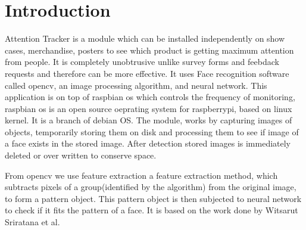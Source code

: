 \section{Introduction}
Attention Tracker is a module which can be installed independently on show cases, merchandise, posters to see which product is getting maximum attention from people. It is completely unobtrusive unlike survey forms and feebdack requests and therefore can be more effective. It uses Face recognition software called opencv, an image processing algorithm, and neural network. This application is on top of
raspbian os which controls the frequency of monitoring, raspbian os is an open source oeprating system for raspberrypi, based on linux kernel. It is a branch of debian OS. The module, works by capturing images of objects, temporarily storing them on disk and processing them to see if image of a face exists in the stored image. After detection stored images is immediately deleted or over written to conserve space. 

From opencv we use feature extraction a feature extraction method, which subtracts pixels of a group(identified by the algorithm) from
the original image, to form a pattern object. This pattern object is then subjected to neural network to check if it fits the pattern of a face. It is based on the work done by Witsarut Sriratana et al\cite{opencv}.

